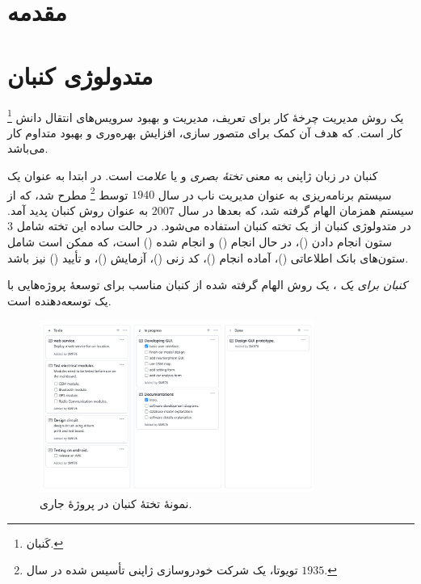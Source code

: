 \label{chap2}

\section{
    مقدمه
}\label{sec1:chap2}


\section{
    متدولوژی کنبان
}\label{sec2:chap2}
\footnote{کَنبان.}
یک روش مدیریت چرخهٔ کار برای تعریف، مدیریت و بهبود سرویس‌های انتقال دانش کار است.
که هدف آن کمک برای متصور سازی، افزایش بهره‌وری و بهبود متداوم کار می‌باشد.

کنبان در زبان ژاپنی به معنی
\emph{تختهٔ بصری}
و یا
\emph{علامت}
است.
در ابتدا به عنوان یک سیستم برنامه‌ریزی به عنوان مدیریت ناب
در سال
$1940$
توسط
\footnote{
    تویوتا، یک ‌شرکت خودروسازی ژاپنی تأسیس شده در سال
    $1935$.
}
مطرح شد، که از سیستم همزمان
الهام گرفته شد، که بعد‌ها در سال
$2007$
به عنوان روش کنبان پدید آمد.
\cite{ohno1988toyota:book}
در متدولوژی کنبان از یک تخته کنبان استفاده می‌شود. 	در حالت ساده این تخته شامل $3$ ستون انجام دادن
()،
در حال انجام
()
و انجام شده
()
است، که ممکن است شامل ستون‌های بانک اطلاعاتی
()،
آماده انجام
()،
کد زنی
()،
آزمایش
()،
و تأ‌یید
()
نیز باشد.
\cite{kanbanize:online}

\emph{
کنبان برای یک
}،
یک روش الهام گرفته شده از کنبان مناسب برای توسعهٔ پروژه‌هایی با یک توسعه‌دهنده است.
\cite{prsonalkanban:online}
\begin{figure}[!h]
    \begin{center}
        \includegraphics[width=0.8\textwidth]{images/kanban-board.pdf}
    \end{center}
    \caption{
        نمونهٔ تختهٔ کنبان در پروژهٔ جاری.
    }
    \label{fig3:sec1:chap2}
\end{figure}

